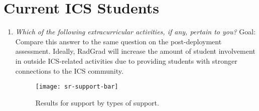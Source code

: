\section{Current ICS Students}
\begin{enumerate}
\begin{figure}[h]
\centering
\texttt{[image: sr-extracurric-bar]}
\caption{Results for extracurricular participation by event type.}
\end{figure}

\begin{figure}[h]
\centering
\texttt{[image: sr-extracurric-pie]}
\caption{Results for extracurricular participation by amount of participation (all students).}
\end{figure}

\begin{figure}[h]
\centering
\texttt{[image: sr-extracurric-pie-midgrad]}
\caption{Results for extracurricular participation by amount of participation (mid to graduating students only).}
\end{figure}
\item \textit{Which of the following extracurricular activities, if any, pertain to you? }
Goal: Compare this answer to the same question on the post-deployment assessment. Ideally, RadGrad will increase the amount of student involvement in outside ICS-related activities due to providing students with stronger connections to the ICS community.
\begin{figure}[h]
\centering
\texttt{[image: sr-support-bar]}
\caption{Results for support by types of support.}
\end{figure}


\end{enumerate}
